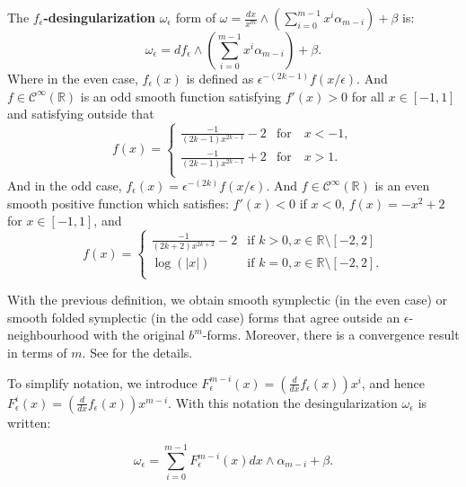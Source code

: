 \begin{definition}The \textbf{$f_\epsilon$-desingularization} $\omega_\epsilon$ form of $\omega= \frac{dx}{x^{m}}\wedge \left(\sum_{i=0}^{m-1}x^i\alpha_{m-i}\right) + \beta$ is:
$$\omega_\epsilon = df_\epsilon \wedge \left(\sum_{i=0}^{m-1}x^i\alpha_{m-i}\right) + \beta.
$$
Where in the even case, $f_\epsilon(x)$ is defined as $\epsilon^{-(2k -1)}f(x/\epsilon)$.
And $f \in \mathcal{C}^\infty(\mathbb{R})$ is an odd smooth function satisfying $f'(x) > 0$ for all $x \in \left[-1,1\right] $ and satisfying outside that
\begin{equation}
f(x) = \begin{cases}
\frac{-1}{(2k-1)x^{2k-1}}-2& \text{for} \quad x < -1,\\
\frac{-1}{(2k-1)x^{2k-1}}+2& \text{for} \quad x > 1.\\
\end{cases}
\end{equation}
And in the odd case, $f_\epsilon(x) = \epsilon^{-(2k)}f(x/\epsilon)$. And $f \in \mathcal{C}^\infty(\mathbb{R})$ is an even smooth positive function which satisfies: $f'(x) < 0$ if $x < 0$, $f(x) = -x^2 + 2$ for $x \in [-1,1]$, and
\begin{equation}
f(x) = \begin{cases}
\frac{-1}{(2k+2)x^{2k+2}}-2& \text{if } k > 0, x \in \mathbb{R}\setminus[-2,2]\\
\log(|x|)& \text{if } k = 0, x \in \mathbb{R}\setminus[-2,2].\\
\end{cases}
\end{equation}
\end{definition}

\begin{remark}
With the previous definition, we obtain smooth symplectic (in the even case) or smooth folded symplectic (in the odd case) forms that agree outside an $\epsilon$-neighbourhood with the original $b^m$-forms. Moreover, there is a convergence result in terms of $m$. See \cite{GMP17} for the details.
\end{remark}

To simplify notation, we introduce $F_{\epsilon}^{m-i}(x) = (\frac{d}{dx}f_\epsilon(x))x^i$, and hence $F_{\epsilon}^{i}(x) = (\frac{d}{dx}f_\epsilon(x))x^{m-i}$. With this notation the desingularization $\omega_\epsilon$ is written:

$$\omega_\epsilon = \sum_{i = 0}^{m-1} F_{\epsilon}^{m-i}(x) dx\wedge \alpha_{m-i} + \beta. $$


